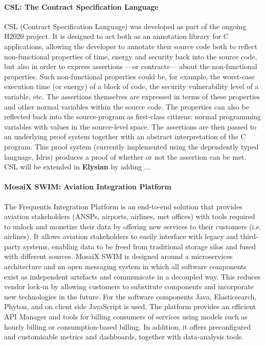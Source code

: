 \documentclass[a4paper,11pt]{article}
\newcommand{\project}[1]{\textbf{#1}\xspace}
\newcommand{\SECURITY}{\project{Elysian}}
\newcommand{\TheProject}{\SECURITY}
\begin{document}
\paragraph {\SAshort{} CSL: The Contract Specification Language}
CSL (Contract Specification Language) was developed as part of the ongoing H2020 \teamplay{} project. It is designed to act both as an annotation library for C applications, allowing the developer to annotate their source code both to reflect non-functional properties of time, energy and security back into the source code, but also in order to express assertions ---or contracts--- about the non-functional properties. Such non-functional properties could be, for example, the worst-case execution time (or energy) of a block of code, the security vulnerability level of a variable, etc. The assertions themselves are expressed in terms of these properties and other normal variables within the source code. The properties can also be reflected back into the source-program as first-class citizens: normal programming variables with values in the source-level space.
The assertions are then passed to an underlying proof system together with an abstract interpretation of the C program. This proof system (currently implemented using the dependently typed language, Idris) produces  a proof of whether or not the assertion can be met. CSL will be extended in \TheProject{} by adding ... 

\paragraph{\FRQshort{} MosaiX SWIM: Aviation Integration Platform}
\label{sec:swim}
The Frequentis Integration Platform is an end-to-end solution that provides aviation stakeholders (ANSPs, airports, airlines, met offices) with tools required to unlock and monetize their data by offering new services to their customers (i.e. airlines). It allows aviation stakeholders to easily interface with legacy and third-party systems, enabling data to be freed from traditional storage silos and fused with different sources. MosaiX SWIM is designed around a microservices architecture and an open messaging system in which all software components exist as independent artefacts and communicate in a decoupled way. This reduces vendor lock-in by allowing customers to substitute components and incorporate new technologies in the future. For the software components  Java, Elasticsearch, Phyton, and on client side JavaScript is used. The platform provides an efficient API Manager and tools for billing consumers of services using models such as hourly billing or consumption-based billing. In addition, it offers preconfigured and customisable metrics and dashboards, together with data-analysis tools.
\end{document}
